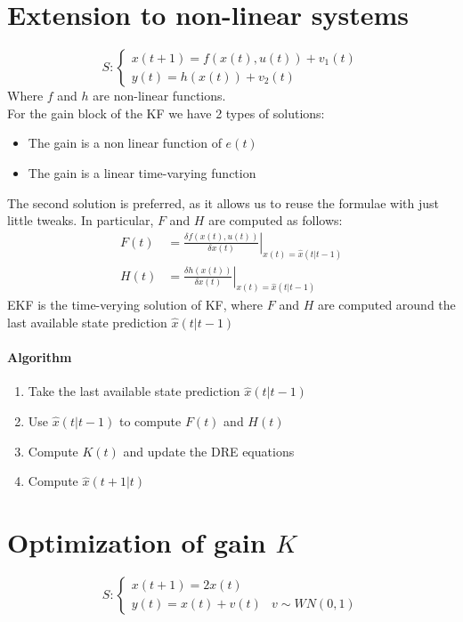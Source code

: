 \documentclass{report}
\begin{document}
\section{Extension to non-linear systems}
\[
S:
\begin{cases}
x(t+1)=f(x(t),u(t))+v_1(t)\\
y(t)=h(x(t))+v_2(t)
\end{cases}
\]
Where $f$ and $h$ are non-linear functions.\\
For the gain block of the KF we have 2 types of solutions:
\begin{itemize}
\item The gain is a non linear function of $e(t)$
\item The gain is a linear time-varying function
\end{itemize}
The second solution is preferred, as it allows us to reuse the formulae with just little tweaks. In particular, $F$ and $H$ are computed as follows:
\begin{align*}
F(t)&=\left.\frac{\delta f(x(t),u(t))}{\delta x(t)}\right\vert_{x(t)=\hat{x}(t|t-1)}\\
H(t)&=\left.\frac{\delta h(x(t))}{\delta x(t)}\right\vert_{x(t)=\hat{x}(t|t-1)}
\end{align*}
EKF is the time-verying solution of KF, where $F$ and $H$ are computed around the last available state prediction $\hat{x}(t|t-1)$
\paragraph{Algorithm}
\begin{enumerate}
\item Take the last available state prediction $\hat{x}(t|t-1)$
\item Use $\hat{x}(t|t-1)$ to compute $F(t)$ and $H(t)$
\item Compute $K(t)$ and update the DRE equations
\item Compute $\hat{x}(t+1|t)$
\end{enumerate}

\section{Optimization of gain $K$}
\[
S:
\begin{cases}
x(t+1)=2x(t)\\
y(t)=x(t)+v(t)&v\sim WN(0,1)
\end{cases}
\]
\end{document}
